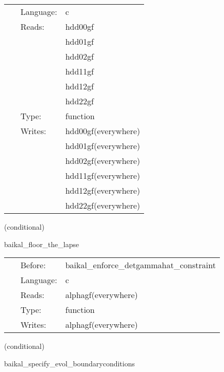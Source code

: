 \hspace{5mm}

 \begin{tabular*}{160mm}{cll} 
~ & Language:  & c \\ 
~ & Reads:  & hdd00gf \\ 
~& ~ &hdd01gf\\ 
~& ~ &hdd02gf\\ 
~& ~ &hdd11gf\\ 
~& ~ &hdd12gf\\ 
~& ~ &hdd22gf\\ 
~ & Type:  & function \\ 
~ & Writes:  & hdd00gf(everywhere) \\ 
~& ~ &hdd01gf(everywhere)\\ 
~& ~ &hdd02gf(everywhere)\\ 
~& ~ &hdd11gf(everywhere)\\ 
~& ~ &hdd12gf(everywhere)\\ 
~& ~ &hdd22gf(everywhere)\\ 
\end{tabular*} 


\vspace{5mm}

   (conditional) 

\hspace{5mm} baikal\_floor\_the\_lapse 

\hspace{5mm}{\it set lapse = max(lapse\_floor, lapse) } 


\hspace{5mm}

 \begin{tabular*}{160mm}{cll} 
~ & Before:  & baikal\_enforce\_detgammahat\_constraint \\ 
~ & Language:  & c \\ 
~ & Reads:  & alphagf(everywhere) \\ 
~ & Type:  & function \\ 
~ & Writes:  & alphagf(everywhere) \\ 
\end{tabular*} 


\vspace{5mm}

   (conditional) 

\hspace{5mm} baikal\_specify\_evol\_boundaryconditions 

\hspace{5mm}{\it register boundary conditions and perform amr+interprocessor synchronization } 


